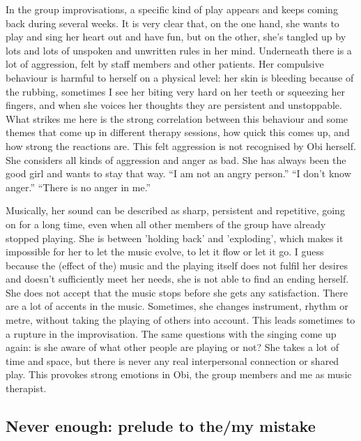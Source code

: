 \documentclass[authordate, empirical, issue]{jote-new-article}
\begin{document}
In the group improvisations, a specific kind of play appears and keeps coming back during several weeks. It is very clear that, on the one hand, she wants to play and sing her heart out and have fun, but on the other, she's tangled up by lots and lots of unspoken and unwritten rules in her mind. Underneath there is a lot of aggression, felt by staff members and other patients. Her compulsive behaviour is harmful to herself on a physical level: her skin is bleeding because of the rubbing, sometimes I see her biting very hard on her teeth or squeezing her fingers, and when she voices her thoughts they are persistent and unstoppable. What strikes me here is the strong correlation between this behaviour and some themes that come up in different therapy sessions, how quick this comes up, and how strong the reactions are. This felt aggression is not recognised by Obi herself. She considers all kinds of aggression and anger as bad. She has always been the good girl and wants to stay that way. “I am not an angry person.” “I don't know anger.” “There is no anger in me.”



Musically, her sound can be described as sharp, persistent and repetitive, going on for a long time, even when all other members of the group have already stopped playing. She is between 'holding back' and 'exploding', which makes it impossible for her to let the music evolve, to let it flow or let it go. I guess because the (effect of the) music and the playing itself does not fulfil her desires and doesn't sufficiently meet her needs, she is not able to find an ending herself. She does not accept that the music stops before she gets any satisfaction. There are a lot of accents in the music. Sometimes, she changes instrument, rhythm or metre, without taking the playing of others into account. This leads sometimes to a rupture in the improvisation. The same questions with the singing come up again: is she aware of what other people are playing or not? She takes a lot of time and space, but there is never any real interpersonal connection or shared play. This provokes strong emotions in Obi, the group members and me as music therapist.







\subsection{Never enough: prelude to the/my mistake}
\end{document}
